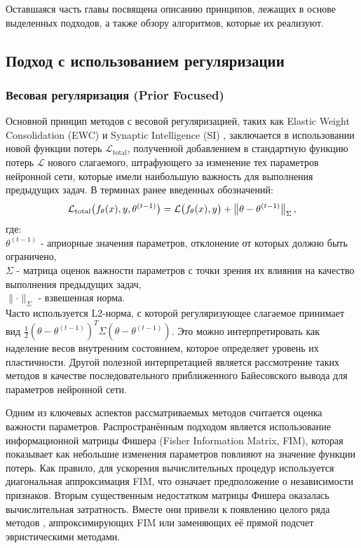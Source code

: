 \documentclass[a4paper,14pt]{extarticle}
\begin{document}
Оставшаяся часть главы посвящена описанию принципов, лежащих в основе выделенных
подходов, а также обзору алгоритмов, которые их реализуют.
\subsection{Подход с использованием регуляризации}
\subsubsection{Весовая регуляризация (Prior Focused)}
Основной принцип методов с весовой регуляризацией, таких как Elastic
Weight Consolidation (EWC) \cite{kirkpatrick2017overcoming} и
Synaptic Intelligence (SI) \cite{zenke2017continual}, заключается в
использовании новой функции потерь \(\mathcal{L}_{\mathrm{total}}\), полученной
добавлением в стандартную функцию потерь \(\mathcal{L}\) нового
слагаемого, штрафующего за изменение тех параметров нейронной сети, которые
имели наибольшую важность для выполнения предыдущих задач. В терминах ранее
введенных обозначений:
\begin{equation}
    \mathcal{L}_{\mathrm{total}}\bigl(f_\theta(x),y,\theta^{(t-1)}\bigr)\\
    =\mathcal{L}\bigl(f_\theta(x),y\bigr)\\
    +\bigl\lVert\theta-\theta^{(t-1)}\bigr\rVert_{\Sigma}\,,
\end{equation}
где:\\
\(\theta^{(t-1)}\) - априорные значения параметров, отклонение от которых должно
быть ограничено,\\
\(\Sigma\) - матрица оценок важности параметров с точки зрения их влияния на
качество выполнения предыдущих задач,\\
\(\lVert\cdot\rVert_{\Sigma}\) - взвешенная норма.\\
Часто используется L2-норма, с которой регуляризующее слагаемое принимает вид
\(\frac{1}{2}(\theta-\theta^{(t-1)})^T\Sigma(\theta-\theta^{(t-1)})\).
Это можно интерпретировать как наделение весов внутренним состоянием, которое
определяет уровень их пластичности. Другой полезной интерпретацией является
рассмотрение таких методов в качестве последовательного приближенного
Байесовского вывода для параметров нейронной сети.

Одним из ключевых аспектов рассматриваемых методов считается оценка важности
параметров. Распространённым подходом является использование информационной
матрицы Фишера (Fisher Information Matrix, FIM), которая показывает как
небольшие изменения параметров повлияют на значение функции потерь. Как правило,
для ускорения вычислительных процедур используется диагональная аппроксимация
FIM, что означает предположение о независимости признаков. Вторым существенным
недостатком матрицы Фишера оказалась вычислительная затратность. Вместе они
привели к появлению целого ряда методов
\cite{zenke2017continual,aljundi2018memory}, аппроксимирующих FIM или заменяющих
её прямой подсчет эвристическими методами.
\end{document}
